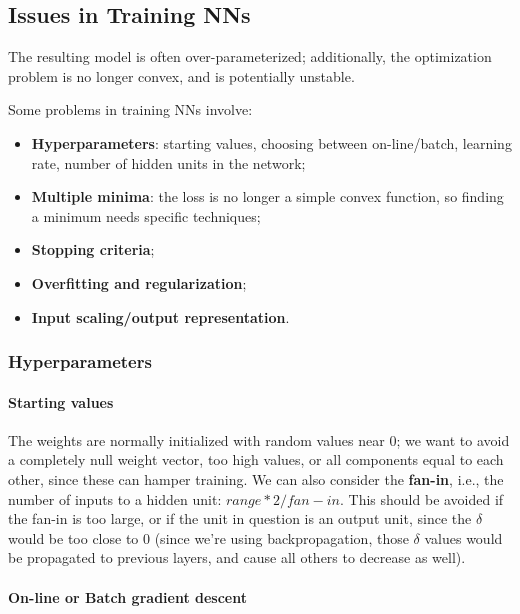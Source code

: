 \subsection{Issues in Training NNs}

The resulting model is often over-parameterized; additionally, the optimization problem is no longer convex, and is potentially unstable.

Some problems in training NNs involve:
\begin{itemize}
    \item \textbf{Hyperparameters}: starting values, choosing between on-line/batch, learning rate, number of hidden units in the network;

    \item \textbf{Multiple minima}: the loss is no longer a simple convex function, so finding a minimum needs specific techniques;

    \item \textbf{Stopping criteria};

    \item \textbf{Overfitting and regularization};

    \item \textbf{Input scaling/output representation}.
\end{itemize}

\subsubsection{Hyperparameters}

\paragraph{Starting values}

The weights are normally initialized with random values near 0; we want to avoid a completely null weight vector, too high values, or all components equal to each other, since these can hamper training. We can also consider the \textbf{fan-in}, i.e., the number of inputs to a hidden unit: $range * 2 /fan-in$. This should be avoided if the fan-in is too large, or if the unit in question is an output unit, since the $\delta$ would be too close to 0 (since we're using backpropagation, those $\delta$ values would be propagated to previous layers, and cause all others to decrease as well).

\paragraph{On-line or Batch gradient descent}

